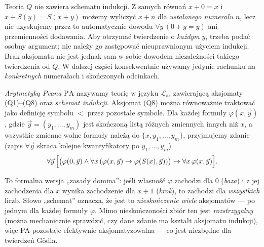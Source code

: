 \begin{uwaga}\label{res:4:8}
Teoria $Q$ nie zawiera schematu indukcji. Z samych równań
$x+0=x$ i $x+S(y)=S(x+y)$ możemy wyliczyć $x+\overline n$
dla \emph{ustalonego numerału} $\overline n$, lecz nie uzyskujemy
przez to automatycznie dowodu $\forall y\,(0+y=y)$ ani
przemienności dodawania. Aby otrzymać twierdzenie o \emph{każdym}
$y$, trzeba podać osobny argument; nie należy go zastępować
nieuprawnionym użyciem indukcji. Brak aksjomatu nie jest jednak
sam w sobie dowodem niezależności takiego twierdzenia od $Q$.
W dalszej części konsekwentnie używamy jedynie rachunku na
\emph{konkretnych} numerałach i skończonych odcinkach.
\end{uwaga}

\begin{definicja}\label{res:4:9}
\emph{Arytmetyką Peana} $\mathrm{PA}$ nazywamy teorię w języku $\mathcal L_{\mathrm{ar}}$ zawierającą aksjomaty (Q1)--(Q8) oraz \emph{schemat indukcji}. Aksjomat (Q8) można równoważnie traktować jako definicję symbolu $<$ przez pozostałe symbole. Dla każdej formuły $\varphi(x,\vec y)$, gdzie $\vec y=(y_1,\ldots,y_m)$ jest skończoną listą różnych zmiennych innych niż $x$, a wszystkie zmienne wolne formuły należą do $\{x,y_1,\ldots,y_m\}$, przyjmujemy zdanie (zapis $\forall\vec y$ skraca kolejne kwantyfikatory po $y_1,\ldots,y_m$)
\[
\forall\vec y\,\Bigl[\bigl(\varphi(0,\vec y)\land\forall x\,(\varphi(x,\vec y)\to\varphi(S(x),\vec y))\bigr)\to\forall x\,\varphi(x,\vec y)\Bigr].
\]
\end{definicja}

\begin{uwaga}\label{res:4:10}
To formalna wersja „zasady domina”: jeśli własność $\varphi$ zachodzi dla $0$ (\emph{baza}) i z jej zachodzenia dla $x$ wynika zachodzenie dla $x+1$ (\emph{krok}), to zachodzi dla \emph{wszystkich} liczb. Słowo „schemat” oznacza, że jest to \emph{nieskończenie wiele} aksjomatów --- po jednym dla każdej formuły $\varphi$. Mimo nieskończoności zbiór ten jest \emph{rozstrzygalny} (można mechanicznie sprawdzić, czy dane zdanie ma kształt aksjomatu indukcji), więc PA pozostaje efektywnie aksjomatyzowalna --- co jest niezbędne dla twierdzeń Gödla.
\end{uwaga}

